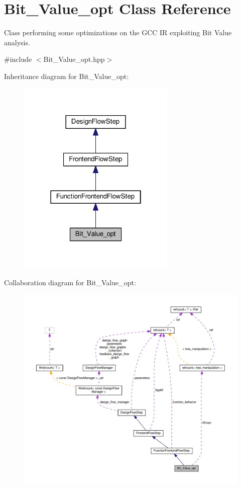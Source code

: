 \hypertarget{classBit__Value__opt}{}\section{Bit\+\_\+\+Value\+\_\+opt Class Reference}
\label{classBit__Value__opt}


Class performing some optimizations on the G\+CC IR exploiting Bit Value analysis.  




{\ttfamily \#include $<$Bit\+\_\+\+Value\+\_\+opt.\+hpp$>$}



Inheritance diagram for Bit\+\_\+\+Value\+\_\+opt\+:
\nopagebreak
\begin{figure}[H]
\begin{center}
\leavevmode
\includegraphics[width=214pt]{d3/df8/classBit__Value__opt__inherit__graph}
\end{center}
\end{figure}


Collaboration diagram for Bit\+\_\+\+Value\+\_\+opt\+:
\nopagebreak
\begin{figure}[H]
\begin{center}
\leavevmode
\includegraphics[width=350pt]{df/dbf/classBit__Value__opt__coll__graph}
\end{center}
\end{figure}
